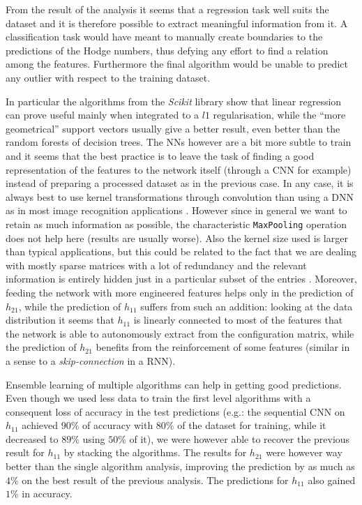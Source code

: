 From the result of the analysis it seems that a regression task well suits the dataset and it is therefore possible to extract meaningful information from it. A classification task would have meant to manually create boundaries to the predictions of the Hodge numbers, thus defying any effort to find a relation among the features. Furthermore the final algorithm would be unable to predict any outlier with respect to the training dataset.

In particular the algorithms from the \textit{Scikit} library show that linear regression can prove useful mainly when integrated to a $l1$ regularisation, while the ``more geometrical'' support vectors usually give a better result, even better than the random forests of decision trees. The NNs however are a bit more subtle to train and it seems that the best practice is to leave the task of finding a good representation of the features to the network itself (through a CNN for example) instead of preparing a processed dataset as in the previous case. In any case, it is always best to use kernel transformations through convolution than using a DNN as in most image recognition applications \cite{NIPS2012_4824}. However since in general we want to retain as much information as possible, the characteristic \texttt{MaxPooling} operation does not help here (results are usually worse). Also the kernel size used is larger than typical applications, but this could be related to the fact that we are dealing with mostly sparse matrices with a lot of redundancy and the relevant information is entirely hidden just in a particular subset of the entries \cite{NIPS2014_5544,jaderberg2014speeding,Liu_2015_CVPR}. Moreover, feeding the network with more engineered features helps only in the prediction of $h_{21}$, while the prediction of $h_{11}$ suffers from such an addition: looking at the data distribution it seems that $h_{11}$ is linearly connected to most of the features that the network is able to autonomously extract from the configuration matrix, while the prediction of $h_{21}$ benefits from the reinforcement of some features (similar in a sense to a \textit{skip-connection} in a RNN).

Ensemble learning of multiple algorithms can help in getting good predictions. Even though we used less data to train the first level algorithms with a consequent loss of accuracy in the test predictions (e.g.: the sequential CNN on $h_{11}$ achieved $90\%$ of accuracy with $80\%$ of the dataset for training, while it decreased to $89\%$ using $50\%$ of it), we were however able to recover the previous result for $h_{11}$ by stacking the algorithms. The results for $h_{21}$ were however way better than the single algorithm analysis, improving the prediction by as much as $4\%$ on the best result of the previous analysis. The predictions for $h_{11}$ also gained $1\%$ in accuracy.

